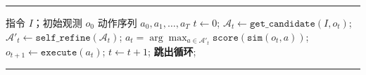 \begingroup
\algrenewcommand{}
\algrenewcommand{}
\algrenewcommand{}
\algrenewcommand{}
\algrenewcommand{}
\algrenewcommand{}
\algrenewcommand{}
\begin{minipage}{.94\linewidth}
\hrule\smallskip
\begin{algorithmic}
\Require 指令 $I$；初始观测 $o_0$
\Ensure 动作序列 $a_0,a_1,\ldots,a_T$
\State $t\gets 0$;
  \State $\mathcal{A}_t\gets\texttt{get\_candidate}(I,o_t)$;
  \State $\mathcal{A}'_t\gets\texttt{self\_refine}(\mathcal{A}_t)$;
  \State $a_t=\arg\max_{a\in\mathcal{A}'_t}\texttt{score}(\texttt{sim}(o_t,a))$;
  \State $o_{t+1}\gets\texttt{execute}(a_t)$;
  \State $t\gets t+1$;
    \State \textbf{跳出循环};
  \EndIf
\EndWhile
\end{algorithmic}
\smallskip\hrule
\end{minipage}
\endgroup
